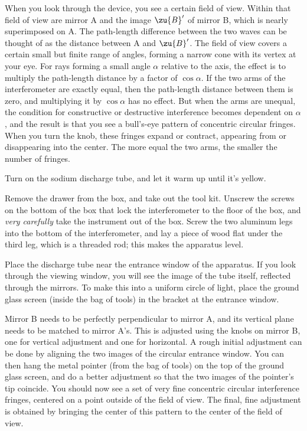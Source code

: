 When you look through the device, you see a certain field of view. Within that
field of view are mirror A and the image $\zu{B}'$ of mirror B, which is nearly superimposed on A.
The path-length difference between the two waves can be thought of as the distance between
A and $\zu{B}'$.
The field of view covers a certain small but finite range of angles, forming
a narrow cone with its vertex at your eye. For rays forming a small angle
$\alpha$ relative to the axis, the effect is to multiply the path-length distance
by a factor of $\cos\alpha$. If the two arms of the interferometer are exactly
equal, then the path-length distance between them is zero, and multiplying it
by $\cos\alpha$ has no effect. But when the arms are unequal, the condition for
constructive or destructive interference becomes dependent on $\alpha$, and the
result is that you see a bull's-eye pattern of concentric circular fringes.
When you turn the knob, these fringes expand or contract, appearing from or disappearing
into the center. The more equal the two arms, the smaller the number of fringes.

\setup

Turn on the sodium discharge tube, and let it warm up until it's yellow.

Remove the drawer from the box, and take out the tool kit. Unscrew the screws
on the bottom of the box that lock the interferometer to the floor of the box,
and \emph{very carefully} take the instrument out of the box. Screw the two
aluminum legs into the bottom of the interferometer, and lay a piece of
wood flat under the third leg, which is a threaded rod; this makes the apparatus
level.

Place the discharge tube near the entrance window of the apparatus. If you look
through the viewing window, you will see the image of the tube itself, reflected
through the mirrors. To make this into a uniform circle of light, place the
ground glass screen (inside the bag of tools) in the bracket at the entrance
window.

Mirror B needs to be perfectly perpendicular to mirror A, and its vertical plane
needs to be matched to mirror A's. This is adjusted using the knobs on mirror B,
one for vertical adjustment and one for horizontal. A rough initial adjustment
can be done by aligning the two images of the circular entrance window. You can
then hang the metal pointer (from the bag of tools) on the top of the ground glass
screen, and do a better adjustment so that the two images of the pointer's
tip coincide. You should now see a set of very fine concentric circular interference
fringes, centered on a point outside of the field of view. The final, fine
adjustment is obtained by bringing the center of this pattern to the center of the
field of view.


